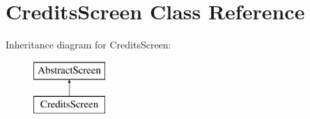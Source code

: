 \hypertarget{class_credits_screen}{}\section{Credits\+Screen Class Reference}
\label{class_credits_screen}
Inheritance diagram for Credits\+Screen\+:\begin{figure}[H]
\begin{center}
\leavevmode
\includegraphics[height=2.000000cm]{class_credits_screen}
\end{center}
\end{figure}
